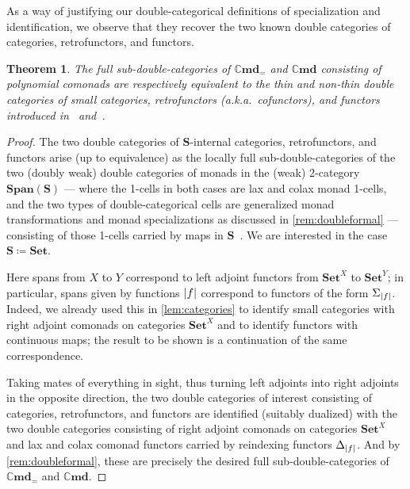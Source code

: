 \documentclass[11pt, oneside, article]{memoir}
\theoremstyle{plain}
\newtheorem{theorem}{Theorem}[section]
\theoremstyle{definition}
\theoremstyle{remark}
\DeclarePairedDelimiter{\abs}{\lvert}{\rvert}
\newcommand{\namedcat}[1]{\mathbf{#1}}
\newcommand{\cat}[1]{\mathbf{#1}}
\newcommand{\Set}{\namedcat{Set}}
\newcommand{\Span}{\namedcat{Span}}
\newcommand{\Cmd}{\mathbb{C}\namedcat{md}}
\newcommand{\CmdSet}{\Cmd}
\newcommand{\CmdId}{\Cmd_=}
\newcommand{\CmdIdSet}{\CmdId}
\newcommand{\MMndIn}[1]{\mathbb{M}\namedcat{nd}(#1)}
\newcommand{\pts}[1]{{\abs{#1}}}
\newcommand{\one}[1]{\pts{#1}}
\newcommand{\leindex}[1]{\Sigma_{#1}}
\newcommand{\reindex}[1]{\Delta_{#1}}
\newcommand{\xX}{X}
\newcommand{\xY}{Y}
\newcommand{\bS}{\cat{S}}
\begin{document}
As a way of justifying our double-categorical definitions of
specialization and identification, we observe that they recover the
two known double categories of categories, retrofunctors, and
functors.

\begin{theorem}\label{thm:doublecat}
  The full sub-double-categories of $\CmdIdSet$ and $\CmdSet$
  consisting of polynomial comonads are respectively equivalent to the
  thin and non-thin double categories of small categories, retrofunctors
  (a.k.a.\ cofunctors), and functors introduced
  in~\cite[Definition 3.1]{clarke}
  and~\cite[Definition 5]{clarke-dimeglio}.
\end{theorem}

\begin{proof}
  The two double categories of $\bS$-internal categories,
  retrofunctors, and functors arise (up to equivalence) as the locally
  full sub-double-categories of the two (doubly weak) double
  categories of monads in the (weak) 2-category $\Span(\bS)$ --- where
  the 1-cells in both cases are lax and colax monad 1-cells, and the
  two types of double-categorical cells are generalized monad
  transformations and monad specializations as discussed in
  \cref{rem:doubleformal} --- consisting of those 1-cells carried by
  maps in $\bS$~\cite[Example 4.8]{fairbanks:monads}.
  We are interested in the case $\bS \coloneqq \Set$.

  Here spans from $\xX$ to $\xY$ correspond to left adjoint functors
  from $\Set^\xX$ to $\Set^\xY$; in particular, spans given by
  functions $\one{f}$ correspond to functors of the form
  $\leindex{\one{f}}$. Indeed, we already used this in
  \cref{lem:categories} to identify small categories with right
  adjoint comonads on categories $\Set^\xX$ and to identify functors
  with continuous maps; the result to be shown is a continuation of
  the same correspondence.

  Taking mates of everything in sight, thus turning left adjoints into
  right adjoints in the opposite direction, the two double categories
  of interest consisting of categories, retrofunctors, and functors
  are identified (suitably dualized) with the two double categories
  consisting of right adjoint comonads on categories $\Set^\xX$ and
  lax and colax comonad functors carried by reindexing functors
  $\reindex{\one{f}}$. And by \cref{rem:doubleformal}, these are precisely
  the desired full sub-double-categories of $\CmdIdSet$ and $\CmdSet$.
\end{proof}
\end{document}
